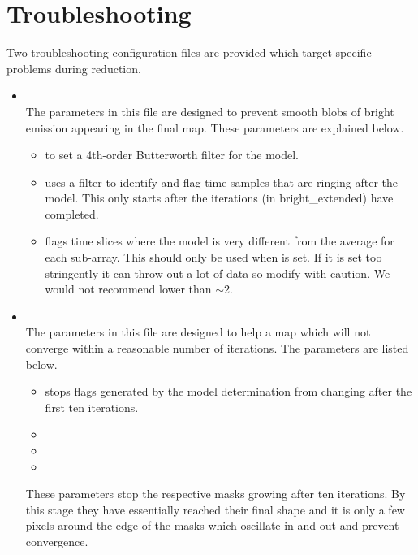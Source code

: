\section{Troubleshooting}
Two troubleshooting configuration files are provided which target specific
problems during reduction.

\begin{itemize}

\item {}\\
The parameters in this file are designed to prevent smooth blobs of bright
emission appearing in the final map. These parameters are explained below.

\begin{itemize}[nolistsep]
\item {} to set a 4th-order Butterworth
  filter for the  model.

\item {} uses a filter to identify and flag
  time-samples that are ringing after the  model. This only starts
  after the  iterations (in bright\_extended) have completed.

\item {} flags time slices where the
   model is very different from the average for each
  sub-array. This should only be used when  is set. If
  it is set too stringently it can throw out a lot of data so modify with
  caution. We would not recommend lower than $\sim$2.
\end{itemize}
\end{itemize}

\begin{itemize}
\item {}\\
The parameters in this file are designed to help a map which will not
converge within a reasonable number of iterations. The parameters are
listed below.
\begin{itemize}[nolistsep]
\item {} stops flags generated by the 
model determination from changing after the first ten iterations.
\item {}
\item {}
\item {}
\end{itemize}

These  parameters stop the respective masks
growing after ten iterations. By this stage they have essentially reached
their final shape and it is only a few pixels around the edge of the masks
which oscillate in and out and prevent convergence.
\end{itemize}


